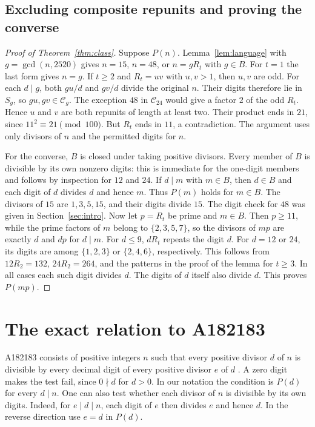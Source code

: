 \documentclass[11pt]{article}
\begin{document}
\subsection{Excluding composite repunits and proving the converse}

\begin{proof}[Proof of Theorem~\ref{thm:class}]
Suppose \(P(n)\). Lemma~\ref{lem:language} with \(g=\gcd(n,2520)\)
gives \(n=15\), \(n=48\), or \(n=gR_t\) with \(g\in B\). For \(t=1\)
the last form gives \(n=g\). If \(t\ge2\) and \(R_t=uv\) with
\(u,v>1\), then \(u,v\) are odd. For each \(d\mid g\), both \(gu/d\)
and \(gv/d\) divide the original \(n\). Their digits therefore lie
in \(S_g\), so \(gu,gv\in\mathcal C_g\). The exception \(48\) in
\(\mathcal C_{24}\) would give a factor \(2\) of the odd \(R_t\).
Hence \(u\) and \(v\) are both repunits of length at least two.
Their product ends in \(21\), since \(11^2\equiv21\pmod{100}\).
But \(R_t\) ends in \(11\), a contradiction. The argument uses only
divisors of \(n\) and the permitted digits for \(n\).

For the converse, \(B\) is closed under taking positive divisors.
Every member of \(B\) is divisible by its own nonzero digits: this is
immediate for the one-digit members and follows by inspection for
\(12\) and \(24\). If \(d\mid m\) with \(m\in B\), then \(d\in B\)
and each digit of \(d\) divides \(d\) and hence \(m\). Thus \(P(m)\)
holds for \(m\in B\). The divisors of \(15\) are \(1,3,5,15\), and their
digits divide \(15\). The digit check for \(48\) was given in
Section~\ref{sec:intro}.
Now let \(p=R_t\) be prime and \(m\in B\). Then \(p\ge11\), while the
prime factors of \(m\) belong to \(\{2,3,5,7\}\), so the divisors of
\(mp\) are exactly \(d\) and \(dp\) for \(d\mid m\). For \(d\le9\),
\(dR_t\) repeats the digit \(d\). For \(d=12\) or \(24\), its digits
are among \(\{1,2,3\}\) or \(\{2,4,6\}\), respectively. This follows
from \(12R_2=132\), \(24R_2=264\), and the patterns in the
proof of the lemma for
\(t\ge3\). In all cases each such digit divides \(d\).
The digits of \(d\) itself also divide \(d\). This proves \(P(mp)\).
\end{proof}

\section{The exact relation to A182183}

A182183 consists of positive integers \(n\) such that every positive
divisor \(d\) of \(n\) is divisible by every decimal digit of every
positive divisor \(e\) of \(d\) \cite{oeis182183}. A zero digit makes
the test fail, since \(0\nmid d\) for \(d>0\). In our notation the
condition is \(P(d)\) for every \(d\mid n\). One can also test
whether each divisor of \(n\) is divisible by its own digits.
Indeed, for \(e\mid d\mid n\), each digit of \(e\) then divides \(e\)
and hence \(d\). In the reverse direction use \(e=d\) in \(P(d)\).
\end{document}

